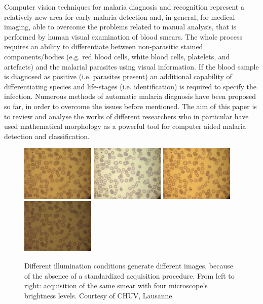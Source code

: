 \documentclass[sensors,review,submit,moreauthors,pdftex,10pt,a4paper]{mdpi}
\begin{document}
	Computer vision techniques for malaria diagnosis and recognition represent a relatively new area for early malaria detection and, in general, for medical imaging, able to overcome the problems related to manual analysis, that is performed by human visual examination of blood smears. The whole process requires an ability to differentiate between non-parasitic stained components/bodies (e.g. red blood cells, white blood cells, platelets, and artefacts) and the malarial parasites using visual information. If the blood sample is diagnosed as positive (i.e. parasites present) an additional capability of differentiating species and life-stages (i.e. identification) is required to specify the infection. Numerous methods of automatic malaria diagnosis have been proposed so far, in order to overcome the issues before mentioned. The aim of this paper is to review and analyse the works of different researchers who in particular have used mathematical morphology as a powerful tool for computer aided malaria detection and classification.
	
	\begin{figure}[!t]
		\centering	
		\includegraphics[width=3.5cm]{img/f1a}
		\includegraphics[width=3.5cm]{img/f1b}
		\includegraphics[width=3.5cm]{img/f1c}
		\includegraphics[width=3.5cm]{img/f1d}
		\caption{\label{fig:images_types}Different illumination conditions generate different images, because of the absence of a standardized acquisition procedure. From left to right: acquisition of the same smear with four microscope's brightness levels.\newline
			Courtesy of CHUV, Lausanne.}
	\end{figure}
	
\end{document}
